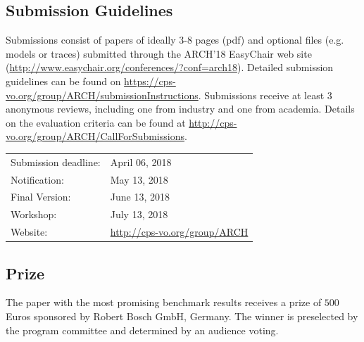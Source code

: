 \documentclass[a4paper,10pt]{article}
\begin{document}
\subsection*{Submission Guidelines}

Submissions consist of papers of ideally 3-8 pages (pdf) and optional files (e.g. models or traces) submitted through the ARCH'18 EasyChair web site (\url{http://www.easychair.org/conferences/?conf=arch18}). Detailed submission guidelines can be found on \url{https://cps-vo.org/group/ARCH/submissionInstructions}. Submissions receive at least 3 anonymous reviews, including one from industry and one from academia. Details on the evaluation criteria can be found at \url{http://cps-vo.org/group/ARCH/CallForSubmissions}. \\



	\begin{tabular}{ll}
		Submission deadline: & April 06, 2018 \\
		Notification: & May 13, 2018 \\
		Final Version: & June 13, 2018 \\
		Workshop: & July 13, 2018 \\
	        Website: & \url{http://cps-vo.org/group/ARCH} 
	\end{tabular}

\subsection*{Prize}

The paper with the most promising benchmark results receives a prize of $500$ Euros sponsored by Robert Bosch GmbH, Germany. The winner is preselected by the program committee and determined by an audience voting.

\end{document}
